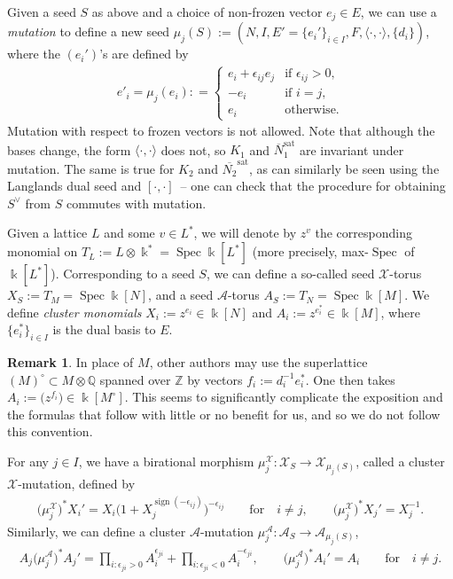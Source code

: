 \documentclass[11pt]{article}
\numberwithin{equation}{section}
\numberwithin{figure}{section}
\numberwithin{table}{section}
\DeclareMathOperator{\Spec}{Spec}
\DeclareMathOperator{\sign}{sign}
\DeclareMathOperator{\sat}{sat}
\let\?=\overline
\let\bb=\mathbb
\let\rar=\rightarrow
\let\s=\mathcal
\let\mb=\mbox
\newcommand {\kk} {\Bbbk}
\theoremstyle{definition}
\newtheorem{rmk}[thm]{Remark}
\begin{document}
Given a seed $S$ as above and a choice of non-frozen vector $e_j\in E$, we can use a {\it mutation} to define a new seed $\mu_j(S):=(N,I,E'=\{e_i'\}_{i\in I},F,\langle\cdot,\cdot\rangle,\{d_i\})$, where the $(e_i')$'s are defined by
\begin{gather}\label{seedmut}
 e'_{i} = \mu_{j}(e_{i}): = \begin{cases}
 e_{i}+\epsilon_{ij}e_{j} &\mb{if $\epsilon_{ij} >0$}, \\
 -e_{i} &\mb{if $i=j$}, \\
	e_{i} &\mb{otherwise}.
	\end{cases}
\end{gather}
Mutation with respect to frozen vectors is not allowed. Note that although the bases change, the form $\langle \cdot,\cdot\rangle$ does not, so $K_1$ and $\?{N}_1^{\sat}$ are invariant under mutation. The same is true for $K_2$ and $\?{N_2}^{\sat}$, as can similarly be seen using the Langlands dual seed and $[\cdot,\cdot]$~-- one can check that the procedure for obtaining $S^{\vee}$ from $S$ commutes with mutation.

Given a lattice $L$ and some $v\in L^*$, we will denote by $z^v$ the corresponding monomial on $T_L:=L\otimes \kk^*=\Spec \kk[L^*]$ (more precisely, max-$\Spec$ of $\kk[L^*]$). Corresponding to a seed $S$, we can define a so-called seed $\s{X}$-torus $X_S:=T_{M}=\Spec \kk[N]$, and a seed $\s{A}$-torus $A_S:=T_{N}=\Spec \kk[M]$.
 We define {\it cluster monomials} $X_i:=z^{e_i}\in \kk[N]$ and $A_i:=z^{e_i^*}\in \kk[M]$, where $\{ e_i^*\}_{i\in I}$ is the dual basis to $E$.

\begin{rmk}\label{convention-departure}In place of $M$, other authors may use the superlattice $(M)^{\circ}\subset M\otimes \bb{Q}$ spanned over $\bb{Z}$ by vectors $f_i:=d_i^{-1}e_i^*$. One then takes $A_i:=\big(z^{f_i}\big) \in \kk[M^{\circ}]$. This seems to significantly complicate the exposition and the formulas that follow with little or no benefit for us, and so we do not follow this convention.
\end{rmk}

For any $j\in I$, we have a birational morphism $\mu_j^{\s{X}}\colon \s{X}_S\rar \s{X}_{\mu_j(S)}$, called a cluster $\s{X}$-mutation, defined by
\begin{gather*}
	\big(\mu_j^{\s{X}}\big)^* X_i' = 	X_i\big(1+X_j^{\sign(-\epsilon_{ij})}\big)^{-\epsilon_{ij}} \qquad \text{for} \quad i\neq j, \qquad \big(\mu_j^{\s{X}}\big)^* X_j' = X_j^{-1} .
\end{gather*}
Similarly, we can define a cluster $\s{A}$-mutation $\mu_j^{\s{A}}\colon \s{A}_S\rar \s{A}_{\mu_j(S)}$,
\begin{gather*}
	A_{j}\big(\mu_j^{\s{A}}\big)^* A_{j}' =\prod_{i\colon \epsilon_{ji}>0} A_{i}^{\epsilon_{ji}} + \prod_{i\colon \epsilon_{ji}<0} A_{i}^{-\epsilon_{ji}},\qquad \big(\mu_j^{\s{A}}\big)^*	A_{i}'=A_{i} \qquad \text{for} \quad i\neq j.
\end{gather*}
\end{document}
